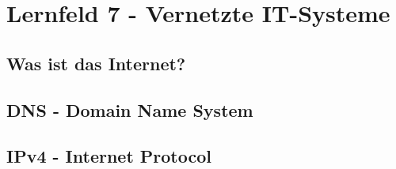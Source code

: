 \section{Lernfeld 7 - Vernetzte IT-Systeme} %


\subsection{Was ist das Internet?}


\subsection{DNS - Domain Name System}

\subsection{IPv4 - Internet Protocol}